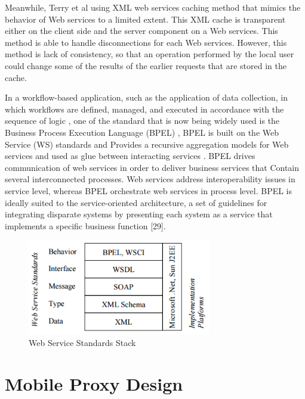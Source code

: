 \documentclass[conference]{IEEEtran}
\begin{document}
Meanwhile, Terry et al using XML web services caching method \cite{terry_caching_2003} that mimics the behavior of Web services to a limited extent. This XML cache is transparent either on the client side and the server component on a Web services. This method is able to handle disconnections for each Web services. However, this method is lack of consistency, so that an operation performed by the local user could change some of the results of the earlier requests that are stored in the cache.

In a workflow-based application, such as the application of data collection, in which workflows are defined, managed, and executed in accordance with the sequence of logic \cite{wieland_towards_2009}, one of the standard that is now being widely used is the Business Process Execution Language (BPEL) \cite{pautasso_restful_2009} \cite{weerawarana_web_2005}, BPEL is built on the Web Service (WS) standards and Provides a recursive aggregation models for Web services \cite{pasley_how_2005} and used as glue between interacting services \cite{weerawarana_web_2005}. BPEL drives communication of web services in order to deliver business services that Contain several interconnected processes. Web services address interoperability issues in service level, whereas BPEL orchestrate web services in process level. BPEL is ideally suited to the service-oriented architecture, a set of guidelines for integrating disparate systems by presenting each system as a service that implements a specific business function [29].

\begin{figure}
    \centering
    \includegraphics[width=8cm]{../Images/ws-standards-stack}
    \caption{Web Service Standards Stack}
    \label{fig:ws-standards-stack}
\end{figure}




\section{Mobile Proxy Design}
\end{document}
